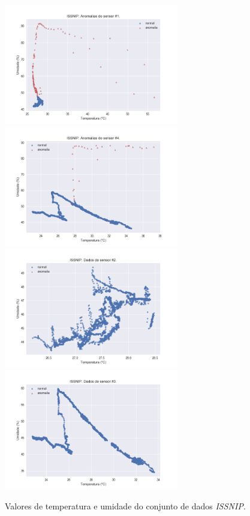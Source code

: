\documentclass[cic,tc]{iiufrgs}
\begin{document}
\begin{figure}
\begin{adjustwidth}{-1in}{-.8in}
\includegraphics[width=0.68\textwidth]{ISSNIP_1.png}
\includegraphics[width=0.68\textwidth]{ISSNIP_4.png}
\includegraphics[width=0.68\textwidth]{ISSNIP_2.png}
\includegraphics[width=0.68\textwidth]{ISSNIP_3.png}
\caption{Valores de temperatura e umidade do conjunto de dados \textit{ISSNIP}.}
\label{graficos_issnip}
\end{adjustwidth}
\end{figure}
\end{document}
